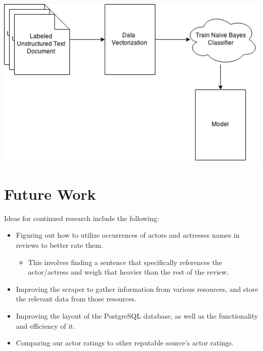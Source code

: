\documentclass[a0,portrait]{a0poster}
\begin{document}
\begin{multicols}{2}
\begin{center}\vspace{1cm}
\includegraphics[width=0.8\linewidth]{sentiment}
\end{center}\vspace{1cm}


\section*{Future Work}

Ideas for continued research include the following:
\begin{itemize}
\item Figuring out how to utilize occurrences of actors and actresses names in reviews to better rate them.
\begin{itemize}
\item This involves finding a sentence that specifically references the actor/actress and weigh that heavier than the rest of the review.
\end{itemize}
\item Improving the scraper to gather information from various resources, and store the relevant data from those resources.
\item Improving the layout of the PostgreSQL database, as well as the functionality and efficiency of it.
\item Comparing our actor ratings to other reputable source's actor ratings.
\end{itemize}



\end{multicols}
\end{document}
